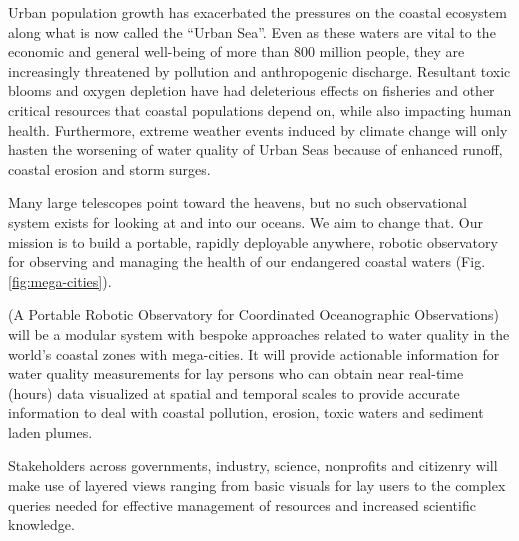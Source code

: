 \documentclass[12pt]{article}
\begin{document}
Urban population growth has exacerbated the pressures on the coastal
ecosystem along what is now called the ``Urban Sea''. Even as these
waters are vital to the economic and general well-being of more than
800 million people, they are increasingly threatened by pollution and
anthropogenic discharge. Resultant toxic blooms and oxygen depletion
have had deleterious effects on fisheries and other critical resources
that coastal populations depend on, while also impacting human
health. Furthermore, extreme weather events induced by climate change
will only hasten the worsening of water quality of Urban Seas because
of enhanced runoff, coastal erosion and storm surges.

Many large telescopes point toward the heavens, but no such
observational system exists for looking at and into our oceans. We aim
to change that. Our mission is to build a portable, rapidly deployable
anywhere, robotic observatory for observing and managing the health of
our endangered coastal
waters %
(Fig. \ref{fig:mega-cities}).

\pro (A Portable Robotic Observatory for Coordinated Oceanographic
Observations) will be a modular system with bespoke approaches related
to water quality in the world's coastal zones with mega-cities. It
will provide actionable information for water quality measurements for
lay persons who can obtain near real-time (hours) data visualized at
spatial and temporal scales to provide accurate information to deal
with coastal pollution, erosion, toxic waters and sediment laden
plumes.

Stakeholders across governments, industry, science, nonprofits and
citizenry will make use of layered views ranging from basic visuals
for lay users to the complex queries needed for effective management
of resources and increased scientific knowledge.


\end{document}
